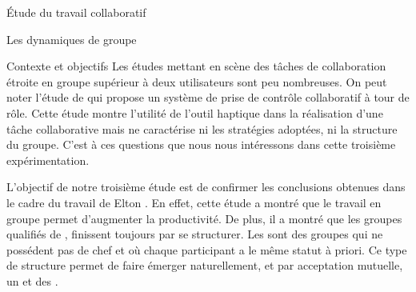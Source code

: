 \documentclass[myfrancais]{mythesis}
\begin{document}
\begin{mypart}{Étude du travail collaboratif}
\begin{mychapter}{Les dynamiques de groupe}
\begin{mysection}{Contexte et objectifs}
				Les études mettant en scène des tâches de collaboration étroite en groupe supérieur à deux utilisateurs sont peu nombreuses.
				On peut noter l'étude de  qui propose un système de prise de contrôle collaboratif à tour de rôle.
				Cette étude montre l'utilité de l'outil haptique dans la réalisation d'une tâche collaborative mais ne caractérise ni les stratégies adoptées, ni la structure du groupe.
				C'est à ces questions que nous nous intéressons dans cette troisième expérimentation.

				L'objectif de notre troisième étude est de confirmer les conclusions obtenues dans le cadre du travail de Elton .
				En effet, cette étude a montré que le travail en groupe permet d'augmenter la productivité.
				De plus, il a montré que les groupes qualifiés de , finissent toujours par se structurer.
				Les  sont des groupes qui ne possédent pas de chef et où chaque participant a le même statut à priori.
				Ce type de structure permet de faire émerger naturellement, et par acceptation mutuelle, un  et des .


\end{mysection}
\end{mychapter}
\end{mypart}
\end{document}
